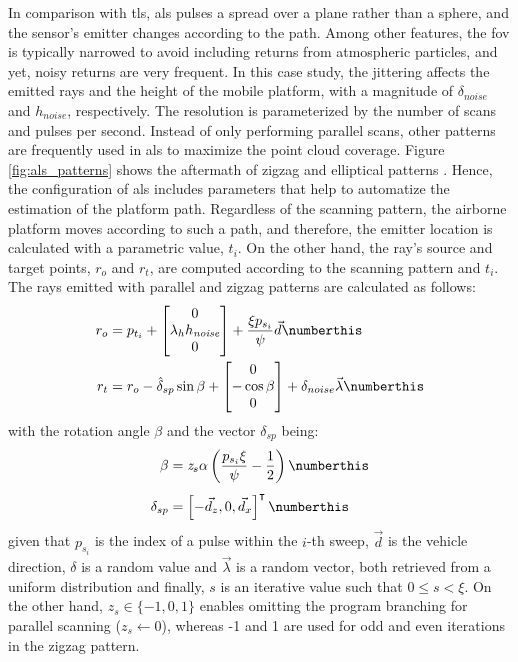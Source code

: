 In comparison with \acrshort{tls}, \acrshort{als} pulses a spread over a plane rather than a sphere, and the sensor's emitter changes according to the path. Among other features, the \acrshort{fov} is typically narrowed to avoid including returns from atmospheric particles, and yet, noisy returns are very frequent. In this case study, the jittering affects the emitted rays and the height of the mobile platform, with a magnitude of $\delta_{\textit{noise}}$ and $h_\textit{noise}$, respectively. The resolution is parameterized by the number of scans and pulses per second. Instead of only performing parallel scans, other patterns are frequently used in \acrshort{als} to maximize the point cloud coverage. Figure \ref{fig:als_patterns} shows the aftermath of zigzag and elliptical patterns \cite{dong_lidar_2018}. Hence, the configuration of \acrshort{als} includes parameters that help to automatize the estimation of the platform path. Regardless of the scanning pattern, the airborne platform moves according to such a path, and therefore, the emitter location is calculated with a parametric value, $t_i$. On the other hand, the ray's source and target points, $r_o$ and $r_t$, are computed according to the scanning pattern and $t_i$. The rays emitted with parallel and zigzag patterns are calculated as follows:
\begin{align*}
    r_{o} &= p_{t_{i}} + 
    \begin{bmatrix} 0 \\ \lambda_{h}h_{\textit{noise}} \\ 0 \end{bmatrix} + \frac{\xi p_{s_{i}}}{\psi} \vec{d}
    \numberthis \label{eq:ray_origin_als_zigzag}\\
    r_{t} &= r_{o} - \hat{\delta}_{sp} \sin{\beta} +
    \begin{bmatrix}0 \\ -\cos{\beta}\\ 0 \end{bmatrix} + \delta_{noise}\vec{\lambda}
    \numberthis \label{eq:ray_target_als_zigzag}
\end{align*}
with the rotation angle $\beta$ and the vector $\delta_{sp}$ being:
\begin{align*}
    \beta &= \textit{z}_{s}\alpha \left(\frac{p_{s_{i}} \xi}{\psi} - \frac{1}{2}\right)
    \numberthis \label{eq:beta_als_zigzag}\\[0.4em]
    \delta_{sp} &= \left[-\vec{d}_{z}, 0, \vec{d}_{x}\right]^\intercal
    \numberthis \label{eq:rotation_axis_als_zigzag}
\end{align*}
given that $p_{s_{i}}$ is the index of a pulse within the $\textit{i}$-th sweep, $\vec{d}$ is the vehicle direction, $\delta$ is a random value and $\vec{\lambda}$ is a random vector, both retrieved from a uniform distribution and finally, $s$ is an iterative value such that $0 \leq s < \xi$. On the other hand, $\textit{z}_{s} \in \{-1, 0, 1\}$ enables omitting the program branching for parallel scanning ($\textit{z}_{s} \gets 0$), whereas -1 and 1 are used for odd and even iterations in the zigzag pattern.

